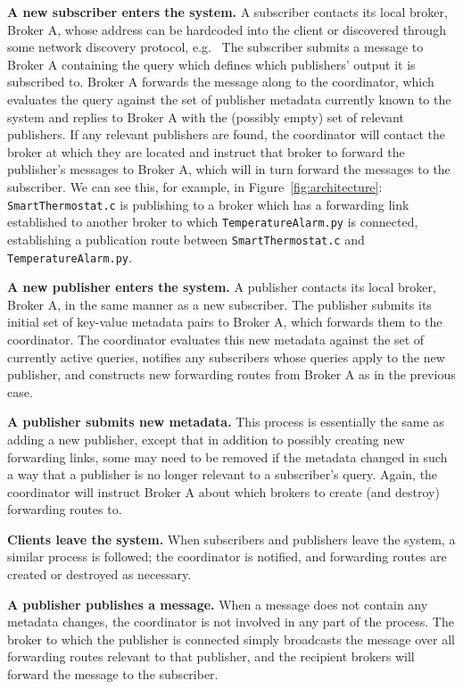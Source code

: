 \textbf{A new subscriber enters the system.}
A subscriber contacts its local broker, Broker A, whose address can be hardcoded into the client or discovered through some network discovery protocol, e.g.\ 
The subscriber submits a message to Broker A containing the query which defines which publishers' output it is subscribed to.
Broker A forwards the message along to the coordinator, which evaluates the query against the set of publisher metadata currently known to the system and replies to Broker A with the (possibly empty) set of relevant publishers.
If any relevant publishers are found, the coordinator will contact the broker at which they are located and instruct that broker to forward the publisher's messages to Broker A, which will in turn forward the messages to the subscriber.
We can see this, for example, in Figure~\ref{fig:architecture}: \texttt{SmartThermostat.c} is publishing to a broker which has a forwarding link established to another broker to which \texttt{TemperatureAlarm.py} is connected, establishing a publication route between \texttt{SmartThermostat.c} and \texttt{TemperatureAlarm.py}.

\textbf{A new publisher enters the system.}
A publisher contacts its local broker, Broker A, in the same manner as a new subscriber.
The publisher submits its initial set of key-value metadata pairs to Broker A, which forwards them to the coordinator.
The coordinator evaluates this new metadata against the set of currently active queries, notifies any subscribers whose queries apply to the new publisher, and constructs new forwarding routes from Broker A as in the previous case.

\textbf{A publisher submits new metadata.}
This process is essentially the same as adding a new publisher, except that in addition to possibly creating new forwarding links, some may need to be removed if the metadata changed in such a way that a publisher is no longer relevant to a subscriber's query.
Again, the coordinator will instruct Broker A about which brokers to create (and destroy) forwarding routes to.

\textbf{Clients leave the system.}
When subscribers and publishers leave the system, a similar process is followed; the coordinator is notified, and forwarding routes are created or destroyed as necessary.

\textbf{A publisher publishes a message.}
When a message does not contain any metadata changes, the coordinator is not involved in any part of the process.
The broker to which the publisher is connected simply broadcasts the message over all forwarding routes relevant to that publisher, and the recipient brokers will forward the message to the subscriber.

